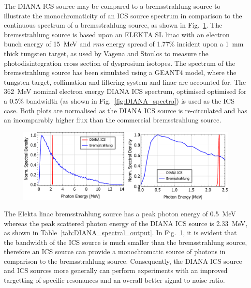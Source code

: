 \documentclass[../main.tex]{subfiles}
\begin{document}
The DIANA ICS source may be compared to a bremsstrahlung source to illustrate the monochromaticity of an ICS source spectrum in comparison to the continuous spectrum of a bremsstrahlung source, as shown in Fig.~\ref{fig:ICS_Brem_comparison}. The bremsstrahlung source is based upon an ELEKTA SL linac \cite{hansen1998quality} with an electron bunch energy of 15~\si{\mega\electronvolt} and \textit{rms} energy spread of 1.77\% incident upon a 1~\si{\milli\meter} thick tungsten target, as used by Vagena and Stoulos \cite{vagena2017photodisintegration} to measure the photodisintegration cross section of dysprosium isotopes. The spectrum of the bremsstrahlung source has been simulated using a \textsc{GEANT4} \cite{agostinelli2003geant4} model, where the tungsten target, collimation and filtering system and linac are accounted for. The 362~\si{\mega\electronvolt} nominal electron energy DIANA ICS spectrum, optimised optimised for a 0.5\%  bandwidth (as shown in Fig.~\ref{fig:DIANA_spectra}) is used as the ICS case. Both plots are normalised as the DIANA ICS source is re-circulated and has an incomparably higher flux than the commercial bremsstrahlung source.
\begin{figure}[!h]
\centering
\includegraphics[width=\textwidth]{Figures/DIANA_Inverse_Compton_Source_Design/ICS_Brem_Comparison.pdf}
\caption{}
\label{fig:ICS_Brem_comparison}
\end{figure}

The Elekta linac bremsstrahlung source has a peak photon energy of 0.5~\si{\mega\electronvolt} whereas the peak scattered photon energy of the DIANA ICS source is 2.33~\si{\mega\electronvolt}, as shown in Table~\ref{tab:DIANA_spectral_output}. In Fig.~\ref{fig:ICS_Brem_comparison}, it is evident that the bandwidth of the ICS source is much smaller than the bremsstrahlung source, therefore an ICS source can provide a monochromatic source of photons in comparison to the bremsstrahlung source. Consequently, the DIANA ICS source and ICS sources more generally can perform experiments with an improved targetting of specific resonances and an overall better signal-to-noise ratio.
\end{document}
